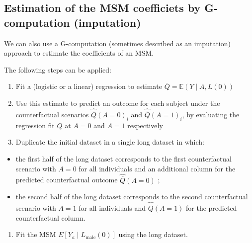\documentclass[
]{book}
\providecommand{\tightlist}{%
  \setlength{\itemsep}{0pt}\setlength{\parskip}{0pt}}
\begin{document}
\hypertarget{estimation-of-the-msm-coefficiets-by-g-computation-imputation}{%
\subsection{Estimation of the MSM coefficiets by G-computation (imputation)}\label{estimation-of-the-msm-coefficiets-by-g-computation-imputation}}

We can also use a G-computation (sometimes described as an imputation) approach to estimate the coefficients of an MSM.

The following steps can be applied:

\begin{enumerate}
\def\labelenumi{\arabic{enumi}.}
\item
  Fit a (logistic or a linear) regression to estimate \(\overline{Q} = \mathbb{E}(Y \mid A, L(0))\)
\item
  Use this estimate to predict an outcome for each subject under the counterfactual scenarios \(\hat{\overline{Q}}(A=0)_i\) and \(\hat{\overline{Q}}(A=1)_i\), by evaluating the regression fit \(\overline{Q}\) at \(A=0\) and \(A=1\) respectively
\item
  Duplicate the initial dataset in a single long dataset in which:
\end{enumerate}

\begin{itemize}
\tightlist
\item
  the first half of the long dataset corresponds to the first counterfactual scenario with \(A=0\) for all individuals and an additional column for the predicted counterfactual outcome \(\hat{\overline{Q}}(A=0)\) ;
\item
  the second half of the long dataset corresponds to the second counterfactual scenario with \(A=1\) for all individuals and \(\hat{\overline{Q}}(A=1)\) for the predicted counterfactual column.
\end{itemize}

\begin{enumerate}
\def\labelenumi{\arabic{enumi}.}
\setcounter{enumi}{3}
\tightlist
\item
  Fit the MSM \(E\left[Y_a \mid L_\text{male}(0)\right]\) using the long dataset.
\end{enumerate}
\end{document}
